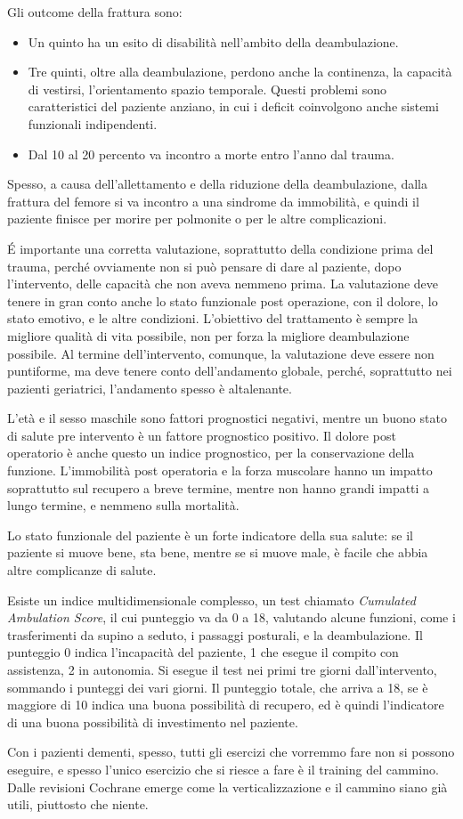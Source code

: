 Gli outcome della frattura sono:
\begin{itemize}
\item Un quinto ha un esito di disabilità nell'ambito della deambulazione.
\item Tre quinti, oltre alla deambulazione, perdono anche la continenza, la 
capacità di vestirsi, l'orientamento spazio temporale. Questi problemi sono 
caratteristici del paziente anziano, in cui i deficit coinvolgono anche sistemi 
funzionali indipendenti.
\item Dal 10 al 20 percento va incontro a morte entro l'anno dal trauma.
\end{itemize}
Spesso, a causa dell'allettamento e della riduzione della deambulazione, dalla 
frattura del femore si va incontro a una sindrome da immobilità, e quindi il 
paziente finisce per morire per polmonite o per le altre complicazioni.

\'E importante una corretta valutazione, soprattutto della condizione prima del 
trauma, perché ovviamente non si può pensare di dare al paziente, dopo 
l'intervento, delle capacità che non aveva nemmeno prima. La valutazione deve 
tenere in gran conto anche lo stato funzionale post operazione, con il dolore, 
lo stato emotivo, e le altre condizioni. L'obiettivo del trattamento è sempre 
la migliore qualità di vita possibile, non per forza la migliore deambulazione 
possibile. Al termine dell'intervento, comunque, la valutazione deve essere non 
puntiforme, ma deve tenere conto dell'andamento globale, perché, soprattutto 
nei pazienti geriatrici, l'andamento spesso è altalenante.

L'età e il sesso maschile sono fattori prognostici negativi, mentre un buono 
stato di salute pre intervento è un fattore prognostico positivo. Il dolore 
post operatorio è anche questo un indice prognostico, per la conservazione 
della funzione. L'immobilità post operatoria e la forza muscolare hanno un 
impatto soprattutto sul recupero a breve termine, mentre non hanno grandi 
impatti a lungo termine, e nemmeno sulla mortalità.

Lo stato funzionale del paziente è un forte indicatore della sua salute: se il 
paziente si muove bene, sta bene, mentre se si muove male, è facile che abbia 
altre complicanze di salute.

Esiste un indice multidimensionale complesso, un test chiamato 
\textit{Cumulated Ambulation Score}, il cui punteggio va da 0 a 18, valutando 
alcune funzioni, come i trasferimenti da supino a seduto, i passaggi posturali, 
e la deambulazione. Il punteggio 0 indica l'incapacità del paziente, 1 che esegue 
il compito con assistenza, 2 in autonomia. Si esegue il test nei primi tre 
giorni dall'intervento, sommando i punteggi dei vari giorni. Il punteggio 
totale, che arriva a 18, se è maggiore di 10 indica una buona possibilità di 
recupero, ed è quindi l'indicatore di una buona possibilità di investimento nel 
paziente.

Con i pazienti dementi, spesso, tutti gli esercizi che vorremmo fare non si 
possono eseguire, e spesso l'unico esercizio che si riesce a fare è il 
training del cammino. Dalle revisioni Cochrane emerge come la verticalizzazione 
e il cammino siano già utili, piuttosto che niente. 
